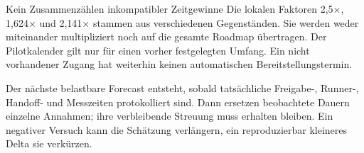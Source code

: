 \vspace{5mm}
\begin{boundary}{Kein Zusammenzählen inkompatibler Zeitgewinne}
Die lokalen Faktoren 2,5×, 1,624× und 2,141× stammen aus verschiedenen Gegenständen. Sie werden weder miteinander multipliziert noch auf die gesamte Roadmap übertragen. Der Pilotkalender gilt nur für einen vorher festgelegten Umfang. Ein nicht vorhandener Zugang hat weiterhin keinen automatischen Bereitstellungstermin.
\end{boundary}
\vspace{3mm}
Der nächste belastbare Forecast entsteht, sobald tatsächliche Freigabe-, Runner-, Handoff- und Messzeiten protokolliert sind. Dann ersetzen beobachtete Dauern einzelne Annahmen; ihre verbleibende Streuung muss erhalten bleiben. Ein negativer Versuch kann die Schätzung verlängern, ein reproduzierbar kleineres Delta sie verkürzen.

